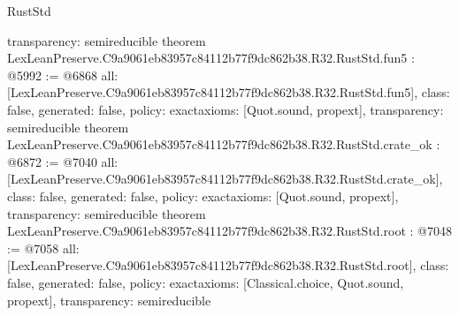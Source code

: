 \begin{lexlean}{RustStd}
\begin{coremodule}
{  transparency: semireducible
}
theorem LexLeanPreserve.C9a9061eb83957c84112b77f9dc862b38.R32.RustStd.fun5 : @5992 := @6868 {
  all: [LexLeanPreserve.C9a9061eb83957c84112b77f9dc862b38.R32.RustStd.fun5],
  class: false,
  generated: false,
  policy: exact{axioms: [Quot.sound, propext]},
  transparency: semireducible
}
theorem LexLeanPreserve.C9a9061eb83957c84112b77f9dc862b38.R32.RustStd.crate_ok : @6872 := @7040 {
  all: [LexLeanPreserve.C9a9061eb83957c84112b77f9dc862b38.R32.RustStd.crate_ok],
  class: false,
  generated: false,
  policy: exact{axioms: [Quot.sound, propext]},
  transparency: semireducible
}
theorem LexLeanPreserve.C9a9061eb83957c84112b77f9dc862b38.R32.RustStd.root : @7048 := @7058 {
  all: [LexLeanPreserve.C9a9061eb83957c84112b77f9dc862b38.R32.RustStd.root],
  class: false,
  generated: false,
  policy: exact{axioms: [Classical.choice, Quot.sound, propext]},
  transparency: semireducible
}


\end{coremodule}
\end{lexlean}
